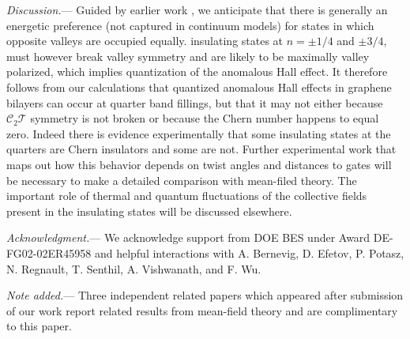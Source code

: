 \documentclass[aps,prl,reprint,amssymb,groupedaddress,twocolumn]{revtex4}
\newcommand{\CT}{$\mathcal{C}_2\mathcal{T}$ }
\begin{document}
{\em Discussion.}--- Guided by earlier work \cite{Jung2014}, we anticipate that there is generally an energetic 
preference (not captured in continuum models) for states in which opposite valleys are occupied equally. 
insulating states  at $n=\pm 1/4$ and $\pm 3/4$, must however break valley symmetry and are likely to be maximally
valley polarized, which implies quantization of the 
anomalous Hall effect.  It therefore follows from our calculations that quantized anomalous Hall 
effects in graphene bilayers can occur at quarter band fillings, 
but that it may not either because \CT symmetry is not broken or because the 
Chern number happens to equal zero.  Indeed there is evidence \cite{Efetov} experimentally
that some insulating states at the quarters are Chern insulators and some are not.  
Further experimental work that maps out how this behavior depends on twist angles 
and distances to gates will be necessary to make a detailed comparison with mean-filed theory.
The important role of thermal and quantum fluctuations of the collective fields present in the insulating states 
will be discussed elsewhere.  

\noindent
\begin{acknowledgements}
{\em Acknowledgment.}---\noindent
We acknowledge support from DOE BES under Award DE-FG02-02ER45958 and helpful
interactions with A. Bernevig, D. Efetov, P. Potasz, N. Regnault, T. Senthil, A. Vishwanath, and F. Wu.  
\end{acknowledgements}

{\em Note added.}---\noindent
Three independent related papers\cite{Ashvin19, ValleyWave, Dai19} which appeared 
after submission of our work report related results from mean-field theory and are complimentary to this paper.  
\end{document}
